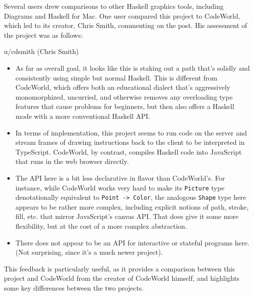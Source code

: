 \documentclass[../main.tex]{subfiles}
\begin{document}
            Several users drew comparisons to other Haskell graphics tools, including
                Diagrams and Haskell for Mac.
            One user compared this project to CodeWorld, which led to its creator, Chris
                Smith, commenting on the post.
            His assessment of the project was as follows:
            \begin{aquote}{u/cdsmith (Chris Smith)}
                \begin{itemize}
                    \item As far as overall goal, it looks like this is
                          staking out a path that's solidly and consistently using simple but normal
                          Haskell.
                          This is different from CodeWorld, which offers both an educational dialect
                              that's aggressively monomorphized, uncurried, and otherwise removes any
                              overloading type features that cause problems for beginners, but then also
                              offers a Haskell mode with a more conventional Haskell API.
                    \item In terms of implementation, this project seems to run code on the server and
                          stream frames of drawing instructions back to the client to be interpreted in
                          TypeScript.
                          CodeWorld, by contrast, compiles Haskell code into JavaScript that runs in the
                              web browser directly.
                    \item The API here is a bit less declarative in flavor than CodeWorld's.
                          For instance, while CodeWorld works very hard to make its \texttt{Picture} type
                              denotationally equivalent to \texttt{Point -> Color}, the analogous
                              \texttt{Shape} type here appears to be rather more complex, including explicit
                              notions of path, stroke, fill, etc. that mirror JavaScript's canvas API.
                          That does give it some more flexibility, but at the cost of a more complex
                              abstraction.
                    \item There does not appear to be an API for interactive or stateful programs here.
                          (Not surprising, since it's a much newer project).
                \end{itemize}
            \end{aquote}
            This feedback is particularly useful, as it provides a comparison between this
                project and CodeWorld from the creator of CodeWorld himself, and highlights
                some key differences between the two projects.
\end{document}
